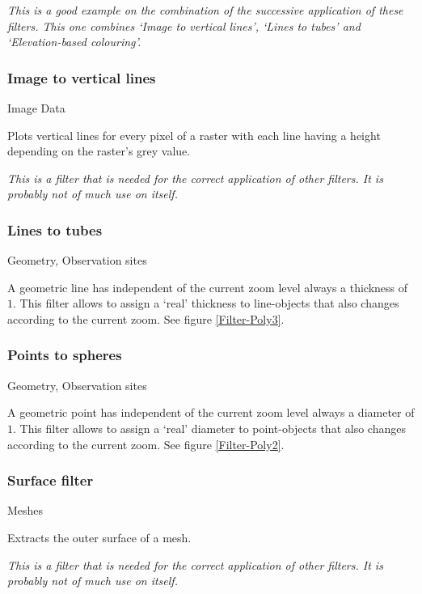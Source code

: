 \emph{This is a good example on the combination of the successive application of these filters. This one combines `Image to vertical lines', `Lines to tubes' and `Elevation-based colouring'.}

\subsubsection{Image to vertical lines}
 Image Data

 Plots vertical lines for every pixel of a raster with each line having a height depending on the raster's grey value.

 \emph{This is a filter that is needed for the correct application of other filters. It is probably not of much use on itself.}

\subsubsection{Lines to tubes}
 Geometry, Observation sites

 A geometric line has independent of the current zoom level always a thickness of $1$. This filter allows to assign a `real' thickness to line-objects that also changes according to the current zoom. See figure \ref{Filter-Poly3}.

\subsubsection{Points to spheres}
 Geometry, Observation sites

 A geometric point has independent of the current zoom level always a diameter of $1$. This filter allows to assign a `real' diameter to point-objects that also changes according to the current zoom. See figure \ref{Filter-Poly2}.

\subsubsection{Surface filter}
 Meshes

 Extracts the outer surface of a mesh.

 \emph{This is a filter that is needed for the correct application of other filters. It is probably not of much use on itself.}
